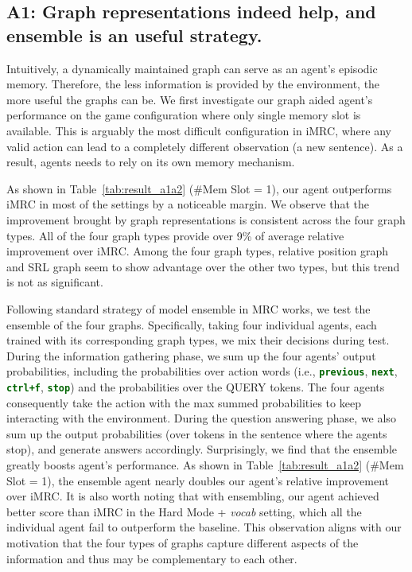 \documentclass[11pt]{article}
\newcommand{\code}[1]{\texttt{#1}}
\newcommand{\cmd}[1]{\textcolor{darkgreen}{\textbf{\small{\code{#1}}}}}
\newcommand{\imrc}{iMRC\xspace}
\newcommand{\query}{\textcolor{orange2}{\small{QUERY}}\xspace}
\begin{document}
\subsection*{A1: Graph representations indeed help, and ensemble is an useful strategy.}
\label{subsection:a1}

Intuitively, a dynamically maintained graph can serve as an agent's episodic memory. 
Therefore, the less information is provided by the environment, the more useful the graphs can be.
We first investigate our graph aided agent's performance on the game configuration where only single memory slot is available.
This is arguably the most difficult configuration in \imrc, where any valid action can lead to a completely different observation (a new sentence).
As a result, agents needs to rely on its own memory mechanism.

As shown in Table~\ref{tab:result_a1a2} (\#Mem Slot = 1), our agent outperforms \imrc in most of the settings by a noticeable margin.
We observe that the improvement brought by graph representations is consistent across the four graph types.
All of the four graph types provide over 9\% of average relative improvement over \imrc.
Among the four graph types, relative position graph and SRL graph seem to show advantage over the other two types, but this trend is not as significant.

Following standard strategy of model ensemble in MRC works, we test the ensemble of the four graphs.
Specifically, taking four individual agents, each trained with its corresponding graph types, we mix their decisions during test.
During the information gathering phase, we sum up the four agents' output probabilities, including the probabilities over action words (i.e., \cmd{previous}, \cmd{next}, \cmd{ctrl+f}, \cmd{stop}) and the probabilities over the \query tokens.
The four agents consequently take the action with the max summed probabilities to keep interacting with the environment.
During the question answering phase, we also sum up the output probabilities (over tokens in the sentence where the agents stop), and generate answers accordingly.
Surprisingly, we find that the ensemble greatly boosts agent's performance.
As shown in Table~\ref{tab:result_a1a2} (\#Mem Slot = 1), the ensemble agent nearly doubles our agent's relative improvement over \imrc. 
It is also worth noting that with ensembling, our agent achieved better score than \imrc in the Hard Mode + \textit{vocab} setting, which all the individual agent fail to outperform the baseline.
This observation aligns with our motivation that the four types of graphs capture different aspects of the information and thus may be complementary to each other.
\end{document}
